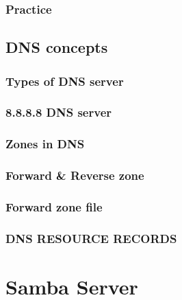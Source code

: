 \documentclass[14pt,fleqn]{extbook} %
\begin{document}
\subsection{Practice}
%
\section{DNS concepts}

\subsection{Types of DNS server}

\subsection{8.8.8.8 DNS server}

\subsection{Zones in DNS}

\subsection{Forward \& Reverse zone}

\subsection{Forward zone file}


\subsection{DNS RESOURCE RECORDS}



\chapter{Samba Server}

\end{document}
